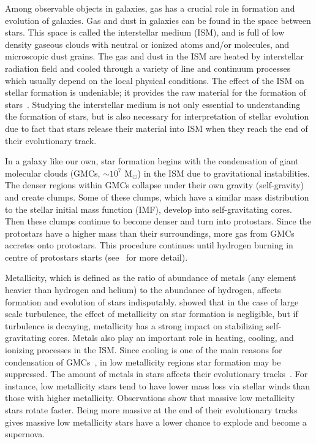 Among observable objects in galaxies, gas has a crucial role in formation and evolution of galaxies.
Gas and dust in galaxies can be found in the space between stars.
This space is called the interstellar medium (ISM), and is full of low density gaseous clouds with neutral or ionized atoms and/or molecules, and microscopic dust grains.
The gas and dust in the ISM are heated by interstellar radiation field and cooled through a variety of line and continuum processes which usually depend on the local physical conditions. 
The effect of the ISM on stellar formation is undeniable; it provides the raw material for the formation of stars~\citep[e.g.][]{Kennicutt08,Bigiel08}.
Studying the interstellar medium is not only essential to understanding the formation of stars, but is also  necessary for interpretation of stellar evolution due to fact that stars release their material into ISM when they reach the end of their evolutionary track.

In a galaxy like our own, star formation begins with the condensation of giant molecular clouds (GMCs, $\sim 10^7$ M$_{\odot}$) in the ISM due to gravitational instabilities. 
The denser regions within GMCs collapse under their own gravity (self-gravity) and create clumps.
Some of these clumps, which have a similar mass distribution to the stellar initial mass function (IMF), develop into self-gravitating cores.
Then these clumps continue to become denser and turn into protostars. 
Since the protostars have a higher mass than their surroundings, more gas from GMCs accretes onto protostars.
This procedure continues until hydrogen burning in centre of protostars starts (see~\cite{McKee07} for more detail). 

Metallicity, which is defined as the ratio of abundance of metals (any element heavier than hydrogen and helium) to the abundance of hydrogen, affects formation and evolution of stars indisputably.
\cite{Walch11} showed that in the case of large scale turbulence, the effect of metallicity on star formation is negligible, but if turbulence is decaying,  metallicity has a strong impact on stabilizing self-gravitating cores.
Metals also play an important role in heating, cooling, and ionizing processes in the ISM.
Since cooling is one of the main reasons for condensation of GMCs~\citep[e.g.][]{Maio07}, in low metallicity regions star formation may be suppressed. 
The amount of metals in stars affects their evolutionary tracks~\citep[e.g.][and references therein]{Maeder02}.
For instance, low metallicity stars tend to have lower mass loss via stellar winds than those with higher metallicity.
Observations show that massive low metallicity stars rotate faster.
Being more massive at the end of their evolutionary tracks gives massive low metallicity stars have a lower chance to explode and become a supernova.


